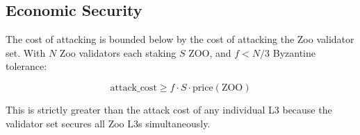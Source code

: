 \subsection{Economic Security}

The cost of attacking \Beluga{} is bounded below by the cost of attacking the Zoo validator set. With $N$ Zoo validators each staking $S$ ZOO, and $f < N/3$ Byzantine tolerance:

\begin{equation}
\text{attack\_cost} \geq f \cdot S \cdot \text{price}(\text{ZOO})
\end{equation}

This is strictly greater than the attack cost of any individual L3 because the validator set secures all Zoo L3s simultaneously.

